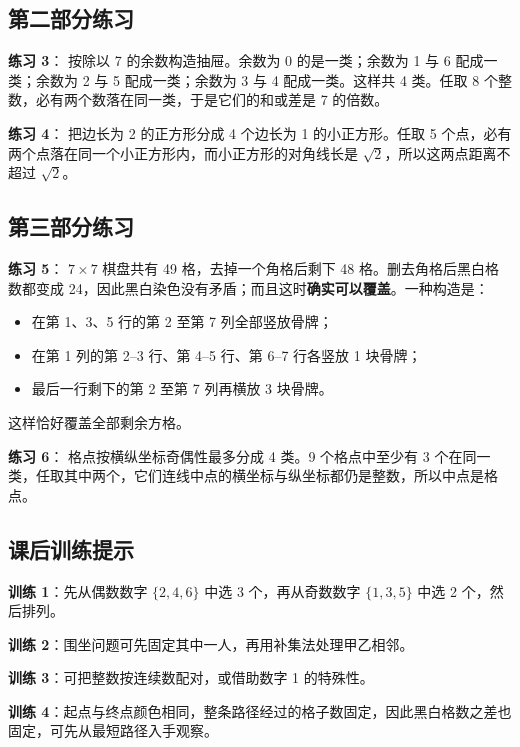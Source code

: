 \documentclass[11pt,a4paper,fontset=fandol]{ctexart}
\theoremstyle{formaltheorem}
\theoremstyle{formalexample}
\begin{document}
\subsection*{第二部分练习}

\textbf{练习 3}：
按除以 7 的余数构造抽屉。余数为 0 的是一类；余数为 1 与 6 配成一类；余数为 2 与 5 配成一类；余数为 3 与 4 配成一类。这样共 4 类。任取 8 个整数，必有两个数落在同一类，于是它们的和或差是 7 的倍数。

\textbf{练习 4}：
把边长为 2 的正方形分成 4 个边长为 1 的小正方形。任取 5 个点，必有两个点落在同一个小正方形内，而小正方形的对角线长是 $\sqrt{2}$，所以这两点距离不超过 $\sqrt{2}$。

\subsection*{第三部分练习}

\textbf{练习 5}：
$7\times 7$ 棋盘共有 49 格，去掉一个角格后剩下 48 格。删去角格后黑白格数都变成 24，因此黑白染色没有矛盾；而且这时\textbf{确实可以覆盖}。一种构造是：
\begin{itemize}
  \item 在第 1、3、5 行的第 2 至第 7 列全部竖放骨牌；
  \item 在第 1 列的第 2--3 行、第 4--5 行、第 6--7 行各竖放 1 块骨牌；
  \item 最后一行剩下的第 2 至第 7 列再横放 3 块骨牌。
\end{itemize}
这样恰好覆盖全部剩余方格。

\textbf{练习 6}：
格点按横纵坐标奇偶性最多分成 4 类。9 个格点中至少有 3 个在同一类，任取其中两个，它们连线中点的横坐标与纵坐标都仍是整数，所以中点是格点。

\subsection*{课后训练提示}

\textbf{训练 1}：先从偶数数字 $\{2,4,6\}$ 中选 3 个，再从奇数数字 $\{1,3,5\}$ 中选 2 个，然后排列。

\textbf{训练 2}：围坐问题可先固定其中一人，再用补集法处理甲乙相邻。

\textbf{训练 3}：可把整数按连续数配对，或借助数字 1 的特殊性。

\textbf{训练 4}：起点与终点颜色相同，整条路径经过的格子数固定，因此黑白格数之差也固定，可先从最短路径入手观察。
\end{document}
